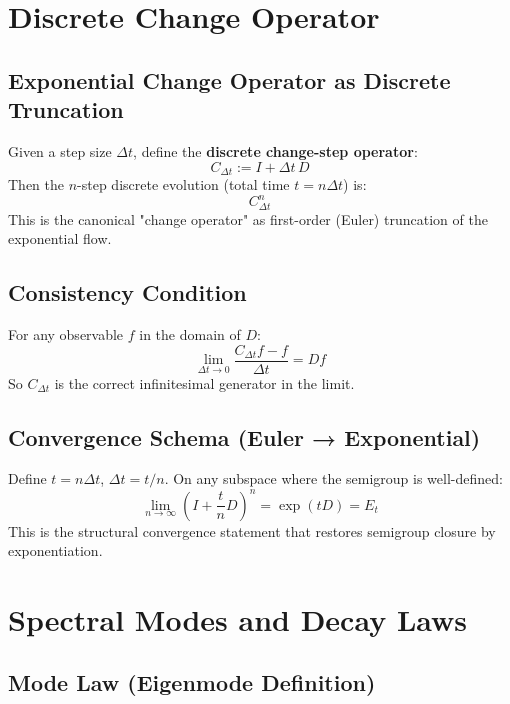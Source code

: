 \documentclass[12pt, oneside]{article}
\begin{document}
\section{Discrete Change Operator}

\subsection{Exponential Change Operator as Discrete Truncation}

Given a step size $\Delta t$, define the \textbf{discrete change-step operator}:
\begin{equation}
C_{\Delta t} := I + \Delta t \, D
\end{equation}
Then the $n$-step discrete evolution (total time $t = n\Delta t$) is:
\begin{equation}
C_{\Delta t}^n
\end{equation}
This is the canonical "change operator" as first-order (Euler) truncation of the exponential flow.

\subsection{Consistency Condition}

For any observable $f$ in the domain of $D$:
\begin{equation}
\lim_{\Delta t \to 0} \frac{C_{\Delta t} f - f}{\Delta t} = Df
\end{equation}
So $C_{\Delta t}$ is the correct infinitesimal generator in the limit.

\subsection{Convergence Schema (Euler → Exponential)}

Define $t = n\Delta t$, $\Delta t = t/n$. On any subspace where the semigroup is well-defined:
\begin{equation}
\lim_{n \to \infty} \left( I + \frac{t}{n} D \right)^n = \exp(tD) = E_t
\end{equation}
This is the structural convergence statement that restores semigroup closure by exponentiation.

\section{Spectral Modes and Decay Laws}

\subsection{Mode Law (Eigenmode Definition)}
\end{document}
